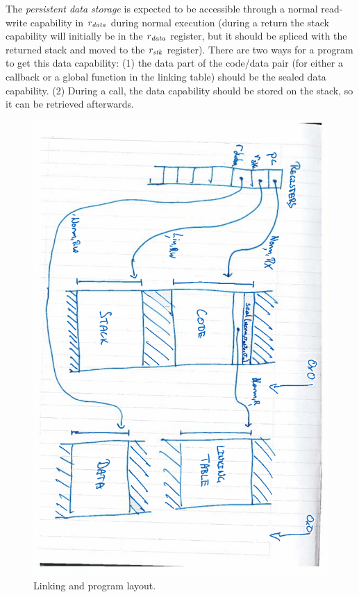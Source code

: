 \documentclass[a4paper]{article}
\begin{document}
The \emph{persistent data storage} is expected to be accessible through a normal read-write capability in $r_{\mathit{data}}$ during normal execution (during a return the stack capability will initially be in the $r_{\mathit{data}}$ register, but it should be spliced with the returned stack and moved to the $r_{\mathit{stk}}$ register). There are two ways for a program to get this data capability: (1) the data part of the code/data pair (for either a callback or a global function in the linking table) should be the sealed data capability. (2) During a call, the data capability should be stored on the stack, so it can be retrieved afterwards.
\begin{figure}
  \centering
  \includegraphics[angle=90,width=\textwidth]{img/linking.pdf}
  \caption{Linking and program layout.}
  \label{fig:trg-prog-link}
\end{figure}
\end{document}
